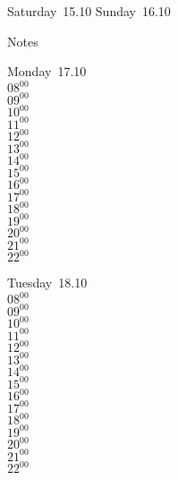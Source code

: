\documentclass[11pt,a4paper]{book}\usepackage[]{graphicx}\usepackage[]{color}
\begin{document}
\begin{weekendbox}
  Saturday~15.10
  \tcblower
  Sunday~16.10
\end{weekendbox} %
\begin{notebox}
  Notes
\end{notebox}
\clearpage
\begin{headerbox}
\end{headerbox}
\begin{weekdaybox}
  Monday~17.10\\
  { 
  \vfill
  $08^{00}$\\
$09^{00}$\\
$10^{00}$\\
$11^{00}$\\
$12^{00}$\\
$13^{00}$\\
$14^{00}$\\
$15^{00}$\\
$16^{00}$\\
$17^{00}$\\
$18^{00}$\\
$19^{00}$\\
$20^{00}$\\
$21^{00}$\\
$22^{00}$\\
  }
\end{weekdaybox}
\begin{weekdaybox}
  Tuesday~18.10\\
  { 
  \vfill
  $08^{00}$\\
$09^{00}$\\
$10^{00}$\\
$11^{00}$\\
$12^{00}$\\
$13^{00}$\\
$14^{00}$\\
$15^{00}$\\
$16^{00}$\\
$17^{00}$\\
$18^{00}$\\
$19^{00}$\\
$20^{00}$\\
$21^{00}$\\
$22^{00}$\\
  }
\end{weekdaybox}
\end{document}

